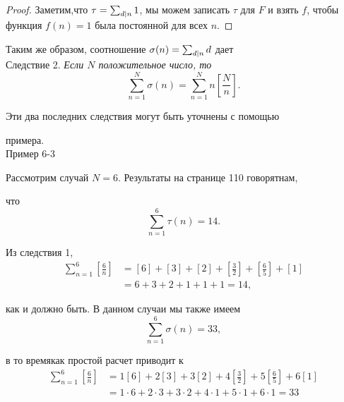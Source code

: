 \documentclass[11pt]{article}
\begin{document}
\begin{proof}
	Заметим,что $ \tau=\sum_{\tiny d|n}1 $, мы можем записать $ \tau $ для $ F $ и взять $ f $, чтобы функция $ f(n)=1 $ была постоянной для всех $ n $.
\end{proof}
Таким же образом, соотношение $\sigma(n)=\sum_{\tiny d|n}d $ дает\\
\label{consequence}
Следствие 2.
\textit{Если $ N $ положительное число, то}\[\sum_{n=1}^{N}\sigma(n)=\sum_{n=1}^{N}n\left[\frac{N}{n}\right].\] 

Эти два последних следствия могут быть
уточнены с помощью 

примера. \vspace{12pt}\\
\label{example}
Пример 6-3

Рассмотрим случай $ N=6 $. Результаты на странице 110 говорятнам, 

что \[\sum_{n=1}^{6}\tau(n)=14.\]

Из следствия 1,
\begin{equation*} \label{eq1}
\begin{split}
	\sum_{n=1}^{6}\left[ \frac{6}{n}\right]&=\left[ 6\right] +\left[ 3\right] +\left[ 2\right] +\left[ \frac{3}{2}\right] +\left[ \frac{6}{5}\right] +\left[ 1\right]\\
	&=6+3+2+1+1+1=14,
\end{split}
\end{equation*}

как и должно быть. В данном случаи мы также имеем
\[\sum_{n=1}^{6}\sigma(n)=33,\]

в то времякак простой расчет приводит к 
\begin{equation*} \label{eq2}
\begin{split}
 \sum_{n=1}^{6}\left[ \frac{6}{n}\right]&=1\left[ 6\right] +2\left[ 3\right] +3\left[ 2\right] +4\left[ \frac{3}{2}\right] +5\left[ \frac{6}{5}\right] +6\left[ 1\right]\\
&=1\cdot6+2\cdot3+3\cdot2+4\cdot1+5\cdot1+6\cdot1=33
\end{split}
\end{equation*}
\end{document}
